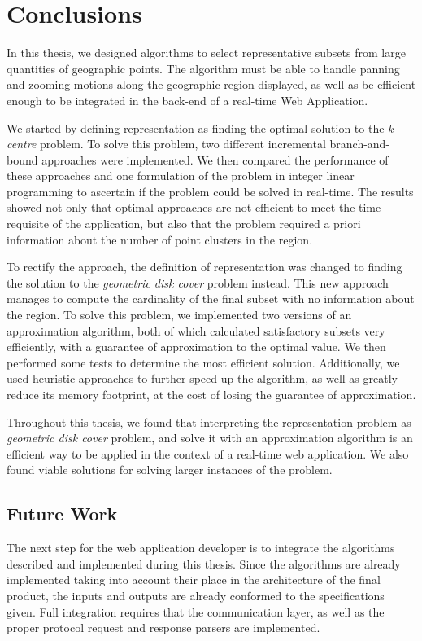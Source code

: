 \cleardoublepage
\chapter{Conclusions}
\label{chap:conc}

\begin{change}
In this thesis, we designed algorithms to select representative subsets from large quantities of geographic points. The algorithm must be able to handle panning and zooming motions along the geographic region displayed, as well as be efficient enough to be integrated in the back-end of a real-time Web Application. 

We started by defining representation as finding the optimal solution to the \emph{k-centre} problem. To solve this problem, two different incremental branch-and-bound approaches were implemented. We then compared the performance of these approaches and one formulation of the problem in integer linear programming to ascertain if the problem could be solved in real-time. The results showed not only that optimal approaches are not efficient to meet the time requisite of the application, but also that the problem required a priori information about the number of point clusters in the region.

To rectify the approach, the definition of representation was changed to finding the solution to the \emph{geometric disk cover} problem instead. This new approach manages to compute the cardinality of the final subset with no information about the region. To solve this problem, we implemented two versions of an approximation algorithm, both of which calculated satisfactory subsets very efficiently, with a guarantee of approximation to the optimal value. We then performed some tests to determine the most efficient solution. Additionally, we used heuristic approaches to further speed up the algorithm, as well as greatly reduce its memory footprint, at the cost of losing the guarantee of approximation.

Throughout this thesis, we found that interpreting the representation problem as \emph{geometric disk cover} problem, and solve it with an approximation algorithm is an efficient way to be applied in the context of a real-time web application. We also found viable solutions for solving larger instances of the problem.

\section{Future Work}
The next step for the web application developer is to integrate the algorithms described and implemented during this thesis. Since the algorithms are already implemented taking into account their place in the architecture of the final product, the inputs and outputs are already conformed to the specifications given. Full integration requires that the communication layer, as well as the proper protocol request and response parsers are implemented.


\end{change}
